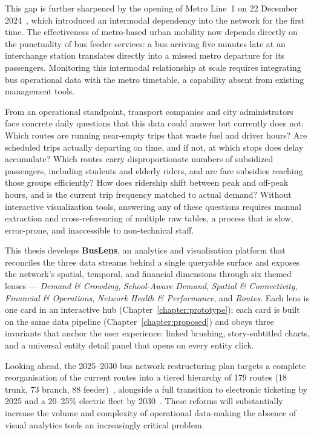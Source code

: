 This gap is further sharpened by the opening of Metro Line~1 on 22 December 2024~\cite{metro_wiki}, which
introduced an intermodal dependency into the network for the first time.
The effectiveness of metro-based urban mobility now depends directly on the
punctuality of bus feeder services: a bus arriving five minutes late at an
interchange station translates directly into a missed metro departure for its
passengers. Monitoring this intermodal relationship at scale requires
integrating bus operational data with the metro timetable, a capability absent
from existing management tools.

From an operational standpoint, transport companies and city administrators
face concrete daily questions that this data could answer but currently does
not: Which routes are running near-empty trips that waste fuel and driver
hours? Are scheduled trips actually departing on time, and if not, at which
stops does delay accumulate? Which routes carry disproportionate numbers of
subsidized passengers, including students and elderly riders, and are fare subsidies
reaching those groups efficiently? How does ridership shift between peak and
off-peak hours, and is the current trip frequency matched to actual demand?
Without interactive visualization tools, answering any of these questions
requires manual extraction and cross-referencing of multiple raw tables,
a process that is slow, error-prone, and inaccessible to non-technical staff.

This thesis develops \textbf{BusLens}, an analytics and visualisation
platform that reconciles the three data streams behind a single
queryable surface and exposes the network's spatial, temporal, and
financial dimensions through six themed lenses ---
\emph{Demand \& Crowding}, \emph{School-Aware Demand},
\emph{Spatial \& Connectivity}, \emph{Financial \& Operations},
\emph{Network Health \& Performance}, and \emph{Routes}. Each lens
is one card in an interactive hub
(Chapter~\ref{chapter:prototype}); each card is built on the same
data pipeline (Chapter~\ref{chapter:proposed}) and obeys three
invariants that anchor the user experience: linked brushing,
story-subtitled charts, and a universal entity detail panel that
opens on every entity click.

Looking ahead, the 2025--2030 bus network restructuring plan targets a
complete reorganisation of the current routes into a tiered hierarchy of
179 routes (18 trunk, 73 branch, 88 feeder)~\cite{vnexpress2023}, alongside
a full transition to electronic ticketing by 2025 and a 20--25\% electric
fleet by 2030~\cite{vnexpress2023}. These reforms will substantially increase
the volume and complexity of operational data-making the absence of visual
analytics tools an increasingly critical problem.


